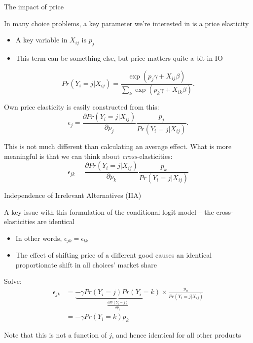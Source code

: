 \documentclass[notes,11pt, aspectratio=169]{beamer}
\newenvironment{wideitemize}{\itemize\addtolength{\itemsep}{10pt}}{\enditemize}
\begin{document}
\begin{frame}{The impact of price}
  \begin{wideitemize}
  \item In many choice problems, a key parameter we're interested in
    is a price elasticity
  \begin{itemize}
  \item A key variable in $X_{ij}$ is $p_{j}$
  \item This term can be something else, but price matters quite a bit in IO
  \end{itemize}
  $$Pr(Y_{i} = j | X_{ij}) = \frac{\exp(p_{j}\gamma + X_{ij}\beta)}{\sum_{k}\exp(p_{k}\gamma +  X_{ik}\beta)}.$$
\item Own price elasticity is easily constructed from this:
      $$\epsilon_{j} = \frac{\partial Pr(Y_{i} = j | X_{ij})}{\partial p_{j}}\frac{p_{j}}{Pr(Y_{i} = j | X_{ij})}.$$
    \item This is not much different than calculating an average
      effect. What is more meaningful is that we can think about
      \emph{cross}-elasticities:
      $$\epsilon_{jk} = \frac{\partial Pr(Y_{i} = j | X_{ij})}{\partial p_{k}}\frac{p_{k}}{Pr(Y_{i} = j | X_{ij})}$$
    \end{wideitemize}
\end{frame}

\begin{frame}{Independence of Irrelevant Alternatives (IIA)}
  \begin{wideitemize}
  \item A key issue with this formulation of the conditional logit
    model -- the cross-elasticities are identical
    \begin{itemize}
    \item In other words, $\epsilon_{jk} = \epsilon_{lk}$
    \item The effect of shifting price of a different good causes an
      identical proportionate shift in all choices' market share
    \end{itemize}
  \item   Solve:
    \begin{align*}
      \epsilon_{jk} &= \underbrace{-\gamma Pr(Y_{i} = j )Pr(Y_{i} = k )}_{\frac{\partial Pr(Y_{i} = j)}{\partial p_{k}}} \times \frac{p_{k}}{Pr(Y_{i} = j | X_{ij})}\\
                    &= -\gamma Pr(Y_{i} = k )p_{k}
    \end{align*}
    \item Note that this is not a function of $j$, and hence identical for
    all other products
  \end{wideitemize}
  
\end{frame}
\end{document}
